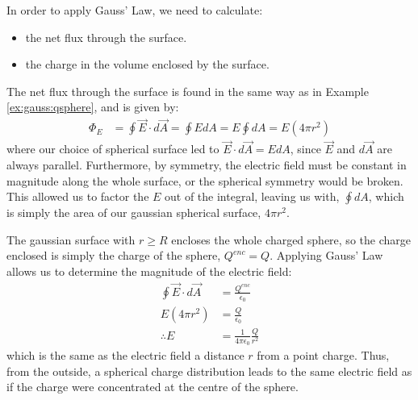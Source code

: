 \begin{example}
In order to apply Gauss' Law, we need to calculate:
\begin{itemize}
\item the net flux through the surface.
\item the charge in the volume enclosed by the surface. 
\end{itemize}
The net flux through the surface is found in the same way as in Example \ref{ex:gauss:qsphere}, and is given by:
\begin{align*}
\Phi_E&=\oint \vec E\cdot d\vec A=\oint E dA= E\oint dA=E(4\pi r^2)
\end{align*}
where our choice of spherical surface led to $\vec E\cdot d\vec A=EdA$, since $\vec E$ and $d\vec A$ are always parallel. Furthermore, by symmetry, the electric field must be constant in magnitude along the whole surface, or the spherical symmetry would be broken. This allowed us to factor the $E$ out of the integral, leaving us with, $\oint dA$, which is simply the area of our gaussian spherical surface, $4\pi r^2$.

The gaussian surface with $r\geq R$ encloses the whole charged sphere, so the charge enclosed is simply the charge of the sphere, $Q^{enc}=Q$. Applying Gauss' Law allows us to determine the magnitude of the electric field:
\begin{align*}
\oint \vec E\cdot d\vec A&=\frac{Q^{enc}}{\epsilon_0} \\
E(4\pi r^2) &= \frac{Q}{\epsilon_0}\\
\therefore E&= \frac{1}{4\pi\epsilon_0}\frac{Q}{r^2}
\end{align*}
which is the same as the electric field a distance $r$ from a point charge. Thus, from the outside, a spherical charge distribution leads to the same electric field as if the charge were concentrated at the centre of the sphere.


\end{example}
